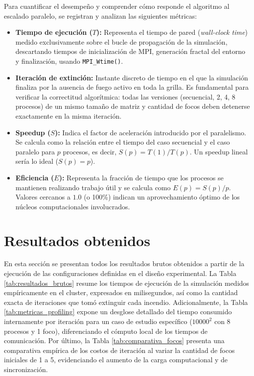 \documentclass[10pt,a4paper]{article}
\begin{document}
Para cuantificar el desempeño y comprender cómo responde el algoritmo al escalado paralelo, se registran y analizan las siguientes métricas:

\begin{itemize}
    \item \textbf{Tiempo de ejecución ($T$):} Representa el tiempo de pared (\textit{wall-clock time}) medido exclusivamente sobre el bucle de propagación de la simulación, descartando tiempos de inicialización de MPI, generación fractal del entorno y finalización, usando \texttt{MPI\_Wtime()}.
    \item \textbf{Iteración de extinción:} Instante discreto de tiempo en el que la simulación finaliza por la ausencia de fuego activo en toda la grilla. Es fundamental para verificar la correctitud algorítmica: todas las versiones (secuencial, 2, 4, 8 procesos) de un mismo tamaño de matriz y cantidad de focos deben detenerse exactamente en la misma iteración.
    \item \textbf{Speedup ($S$):} Indica el factor de aceleración introducido por el paralelismo. Se calcula como la relación entre el tiempo del caso secuencial y el caso paralelo para $p$ procesos, es decir, $S(p) = T(1) / T(p)$. Un speedup lineal sería lo ideal ($S(p) = p$).
    \item \textbf{Eficiencia ($E$):} Representa la fracción de tiempo que los procesos se mantienen realizando trabajo útil y se calcula como $E(p) = S(p) / p$. Valores cercanos a $1.0$ (o 100\%) indican un aprovechamiento óptimo de los núcleos computacionales involucrados.
\end{itemize}

\section{Resultados obtenidos}

En esta sección se presentan todos los resultados brutos obtenidos a partir de la ejecución de las configuraciones definidas en el diseño experimental. La Tabla \ref{tab:resultados_brutos} resume los tiempos de ejecución de la simulación medidos empíricamente en el cluster, expresados en milisegundos, así como la cantidad exacta de iteraciones que tomó extinguir cada incendio. Adicionalmente, la Tabla \ref{tab:metricas_profiling} expone un desglose detallado del tiempo consumido internamente por iteración para un caso de estudio específico ($10000^2$ con 8 procesos y 1 foco), diferenciando el cómputo local de los tiempos de comunicación. Por último, la Tabla \ref{tab:comparativa_focos} presenta una comparativa empírica de los costos de iteración al variar la cantidad de focos iniciales de 1 a 5, evidenciando el aumento de la carga computacional y de sincronización.
\end{document}
